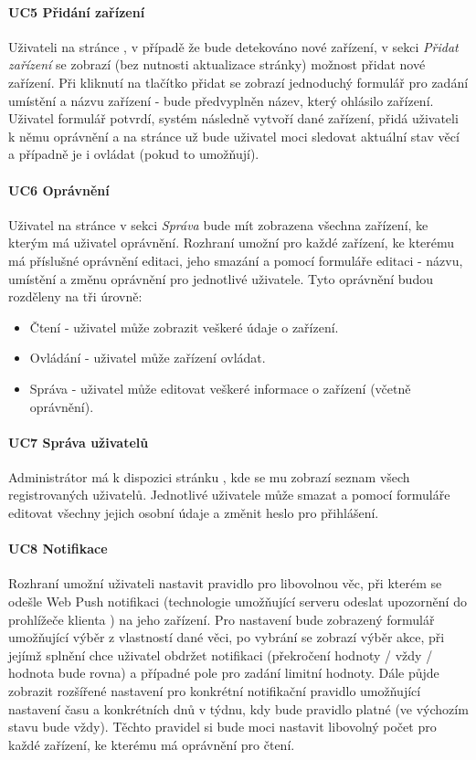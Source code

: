 \paragraph{UC5 Přidání zařízení}
\label{UC5}
Uživateli na stránce , v případě že bude detekováno nové zařízení, v sekci \textit{Přidat zařízení} se zobrazí (bez nutnosti aktualizace stránky) možnost přidat nové zařízení. Při kliknutí na tlačítko přidat se zobrazí jednoduchý formulář pro zadání umístění a názvu zařízení - bude předvyplněn název, který ohlásilo zařízení. Uživatel formulář potvrdí, systém následně vytvoří dané zařízení, přidá uživateli k němu oprávnění a na stránce  už bude uživatel moci sledovat aktuální stav věcí a případně je i ovládat (pokud to umožňují).

\paragraph{UC6 Oprávnění}
Uživatel na stránce  v sekci \textit{Správa} bude mít zobrazena všechna zařízení, ke kterým má uživatel oprávnění. Rozhraní umožní pro každé zařízení, ke kterému má příslušné oprávnění editaci, jeho smazání a pomocí formuláře editaci - názvu, umístění a změnu oprávnění pro jednotlivé uživatele. Tyto oprávnění budou rozděleny na tři úrovně:
\begin{itemize}
    \item Čtení - uživatel může zobrazit veškeré údaje o zařízení.
    \item Ovládání - uživatel může zařízení ovládat.
    \item Správa - uživatel může editovat veškeré informace o zařízení (včetně oprávnění).
\end{itemize}

\paragraph{UC7 Správa uživatelů}
Administrátor má k dispozici stránku , kde se mu zobrazí seznam všech registrovaných uživatelů. Jednotlivé uživatele může smazat a pomocí formuláře editovat všechny jejich osobní údaje a změnit heslo pro přihlášení.

\paragraph{UC8 Notifikace}
Rozhraní umožní uživateli nastavit pravidlo pro libovolnou věc, při kterém se odešle Web Push notifikaci (technologie umožňující serveru odeslat upozornění do prohlížeče klienta \cite{web-push}) na jeho zařízení. Pro nastavení bude zobrazený formulář umožňující výběr z vlastností dané věci, po vybrání se zobrazí výběr akce, při jejímž splnění chce uživatel obdržet notifikaci (překročení hodnoty / vždy / hodnota bude rovna) a případné pole pro zadání limitní hodnoty. Dále půjde zobrazit rozšířené nastavení pro konkrétní notifikační pravidlo umožňující nastavení času a konkrétních dnů v týdnu, kdy bude pravidlo platné (ve výchozím stavu bude vždy). Těchto pravidel si bude moci nastavit libovolný počet pro každé zařízení, ke kterému má oprávnění pro čtení.



